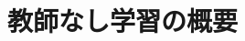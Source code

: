 \documentclass[../../topic_machine-learning]{subfiles}
\begin{document}
\chapter{教師なし学習の概要}


\end{document}
